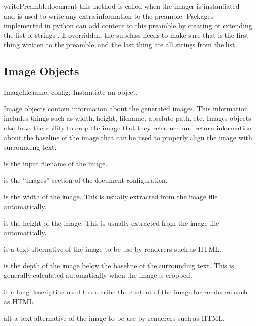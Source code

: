 \begin{methoddesc}[Imager]{writePreamble}{document}
this method is called when the imager is instantiated and is used to
write any extra information to the preamble.  
Packages implemented in python can add content to this preamble by creating or
extending the list of strings .
If overridden, the subclass needs to make sure that
 is the first thing written to the preamble, and
the last thing are all strings from the
 list.
\end{methoddesc}


\subsection{Image Objects}

\begin{classdesc}{Image}{filename, config, }
Instantiate an  object.

Image objects contain information about the generated images.  This
information includes things such as width, height, filename, absolute
path, etc.  Images objects also have the ability to crop the image
that they reference and return information about the baseline of the
image that can be used to properly align the image with surrounding
text.

 is the input filename of the image.

 is the ``images'' section of the document configuration.

 is the width of the image.  This is usually extracted from
the image file automatically.

 is the height of the image.  This is usually extracted
from the image file automatically.

 is a text alternative of the image to be use by renderers such
as HTML.

 is the depth of the image below the baseline of the
surrounding text.  This is generally calculated automatically when
the image is cropped.

 is a long description used to describe the content of
the image for renderers such as HTML.
\end{classdesc}

\begin{memberdesc}[Image]{alt}
a text alternative of the image to be use by renderers such as HTML.
\end{memberdesc}

